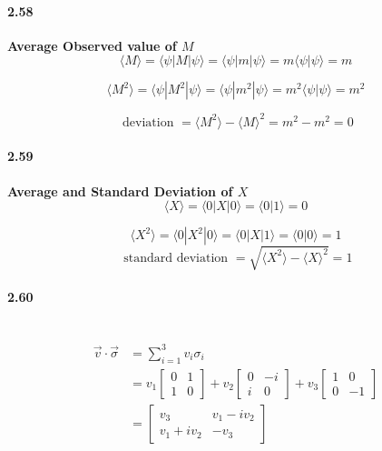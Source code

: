 \paragraph{2.58} \textbf{Average Observed value of $M$}%
\\
$$ \langle M \rangle = \langle \psi |M| \psi \rangle = \langle \psi |m | \psi \rangle  = m \langle \psi | \psi \rangle = m$$

$$ \langle M^2 \rangle = \langle \psi |M^2| \psi \rangle = \langle \psi |m^2 | \psi \rangle  = m^2 \langle \psi | \psi \rangle = m^2$$

$$\text{ deviation } = \langle M^2 \rangle - \langle M \rangle^2 = m^2 - m^2 = 0$$

\paragraph{2.59} \textbf{Average and Standard Deviation of $X$}%
\\
$$ \langle X \rangle = \langle 0 |X| 0\rangle = \langle 0 | 1 \rangle = 0$$

$$ \langle X^2 \rangle = \langle 0 |X^2 | 0 \rangle = \langle 0 | X | 1\rangle = \langle 0| 0 \rangle = 1$$
$$ \text{ standard deviation } = \sqrt{ \langle X^2 \rangle - \langle X \rangle^2 } = 1$$


\paragraph{2.60} \textbf{}%
\\
\begin{align*}
    \vec{v} \cdot \vec{\sigma} &= \sum_{i=1}^3 v_i \sigma_i\\
    &= v_1 \begin{bmatrix}
        0 & 1 \\
        1 & 0
    \end{bmatrix}
    + v_2 \begin{bmatrix}
        0 & -i \\
        i & 0
    \end{bmatrix}
    + v_3 \begin{bmatrix}
        1 & 0 \\
        0 & -1
    \end{bmatrix} \\
    &= \begin{bmatrix}
        v_3 & v_1 - i v_2 \\
        v_1 + iv_2 & -v_3
    \end{bmatrix}
\end{align*}

